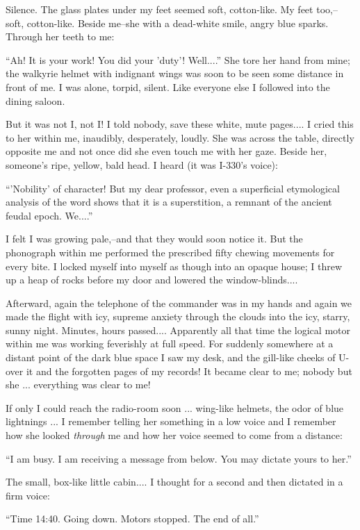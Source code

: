 \documentclass[11pt,openany]{book}
\begin{document}
Silence. The glass plates under my feet seemed soft, cotton-like. My feet too,--soft, cotton-like. Beside me--she with a dead-white smile, angry blue sparks. Through her teeth to me:

``Ah! It is your work! You did your 'duty'! Well....'' She tore her hand from mine; the walkyrie helmet with indignant wings was soon to be seen some distance in front of me. I was alone, torpid, silent. Like everyone else I followed into the dining saloon.

But it was not I, not I! I told nobody, save these white, mute pages.... I cried this to her within me, inaudibly, desperately, loudly. She was across the table, directly opposite me and not once did she even touch me with her gaze. Beside her, someone's ripe, yellow, bald head. I heard (it was I-330's voice):

``'Nobility' of character! But my dear professor, even a superficial etymological analysis of the word shows that it is a superstition, a remnant of the ancient feudal epoch. We....''

I felt I was growing pale,--and that they would soon notice it. But the phonograph within me performed the prescribed fifty chewing movements for every bite. I locked myself into myself as though into an opaque house; I threw up a heap of rocks before my door and lowered the window-blinds....

Afterward, again the telephone of the commander was in my hands and again we made the flight with icy, supreme anxiety through the clouds into the icy, starry, sunny night. Minutes, hours passed.... Apparently all that time the logical motor within me was working feverishly at full speed. For suddenly somewhere at a distant point of the dark blue space I saw my desk, and the gill-like cheeks of U- over it and the forgotten pages of my records! It became clear to me; nobody but she ... everything was clear to me!

If only I could reach the radio-room soon ... wing-like helmets, the odor of blue lightnings ... I remember telling her something in a low voice and I remember how she looked \emph{through} me and how her voice seemed to come from a distance:

``I am busy. I am receiving a message from below. You may dictate yours to her.''

The small, box-like little cabin.... I thought for a second and then dictated in a firm voice:

``Time 14:40. Going down. Motors stopped. The end of all.''
\end{document}
